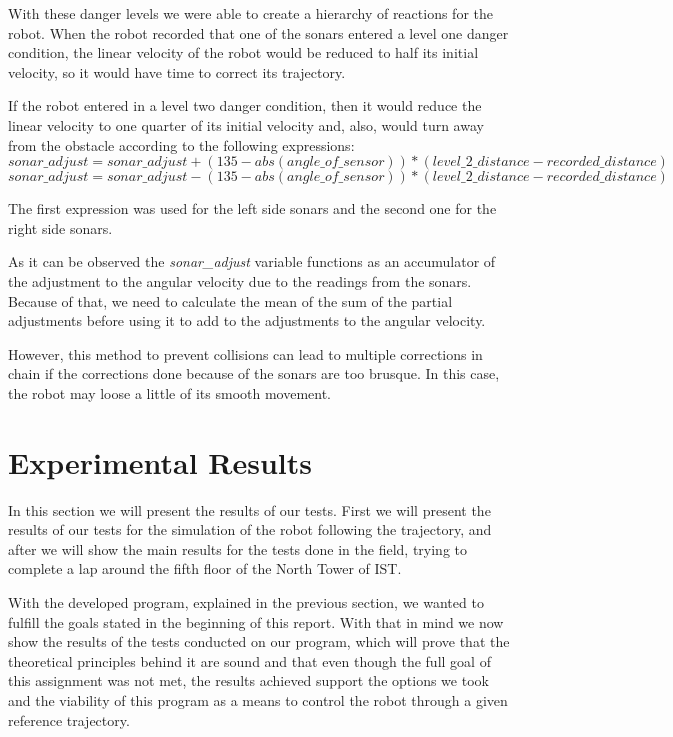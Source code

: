 \documentclass[11pt,a4paper]{scrartcl}
\begin{document}
With these danger levels we were able to create a hierarchy of reactions for the robot. When the robot recorded that one of the sonars entered a level one danger condition, the linear velocity of the robot would be reduced to half its initial velocity, so it would have time to correct its trajectory.

If the robot entered in a level two danger condition, then it would reduce the linear velocity to one quarter of its initial velocity and, also, would turn away from the obstacle according to the following expressions:
\[ sonar\_adjust = sonar\_adjust + (135 - abs(angle\_of\_sensor))*(level\_2\_distance - recorded\_distance)\]
\[ sonar\_adjust = sonar\_adjust - (135 - abs(angle\_of\_sensor))*(level\_2\_distance - recorded\_distance)\]

The first expression was used for the left side sonars and the second one for the right side sonars.

As it can be observed the \textit{sonar\_adjust} variable functions as an accumulator of the adjustment to the angular velocity due to the readings from the sonars. Because of that, we need to calculate the mean of the sum of the partial adjustments before using it to add to the adjustments to the angular velocity.

However, this method to prevent collisions can lead to multiple corrections in chain if the corrections done because of the sonars are too brusque. In this case, the robot may loose a little of its smooth movement.

\section{Experimental Results}
In this section we will present the results of our tests. First we will present the results of our tests for the simulation of the robot following the trajectory, and after we will show the main results for the tests done in the field, trying to complete a lap around the fifth floor of the North Tower of IST.

With the developed program, explained in the previous section, we wanted to fulfill the goals stated in the beginning of this report. With that in mind we now show the results of the tests conducted on our program, which will prove that the theoretical principles behind it are sound and that even though the full goal of this assignment was not met, the results achieved support the options we took and the viability of this program as a means to control the robot through a given reference trajectory.
\end{document}
